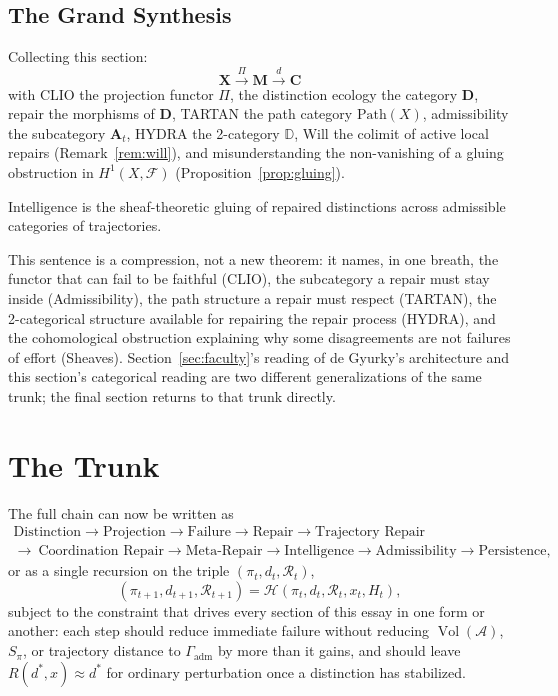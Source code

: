 \documentclass[11pt]{article}
\theoremstyle{plain}
\theoremstyle{definition}
\theoremstyle{remark}
\begin{document}
\subsection{The Grand Synthesis}

Collecting this section:
\[
\mathbf{X} \xrightarrow{\;\Pi\;} \mathbf{M} \xrightarrow{\;d\;} \mathbf{C}
\]
with CLIO the projection functor $\Pi$, the distinction ecology the category $\mathbf{D}$, repair the morphisms of $\mathbf{D}$, TARTAN the path category $\mathrm{Path}(X)$, admissibility the subcategory $\mathbf{A}_t$, HYDRA the 2-category $\mathbb{D}$, Will the colimit of active local repairs (Remark~\ref{rem:will}), and misunderstanding the non-vanishing of a gluing obstruction in $H^1(X,\mathscr{F})$ (Proposition~\ref{prop:gluing}).

\begin{tcolorbox}[title=Categorical Compression]
\centering
Intelligence is the sheaf-theoretic gluing of repaired distinctions across admissible categories of trajectories.
\end{tcolorbox}

This sentence is a compression, not a new theorem: it names, in one breath, the functor that can fail to be faithful (CLIO), the subcategory a repair must stay inside (Admissibility), the path structure a repair must respect (TARTAN), the 2-categorical structure available for repairing the repair process (HYDRA), and the cohomological obstruction explaining why some disagreements are not failures of effort (Sheaves). Section~\ref{sec:faculty}'s reading of de Gyurky's architecture and this section's categorical reading are two different generalizations of the same trunk; the final section returns to that trunk directly.

\section{The Trunk}

The full chain can now be written as
\[
\begin{gathered}
\text{Distinction} \to \text{Projection} \to \text{Failure} \to \text{Repair} \to \text{Trajectory Repair}\\[2pt]
\to\ \text{Coordination Repair} \to \text{Meta-Repair} \to \text{Intelligence} \to \text{Admissibility} \to \text{Persistence},
\end{gathered}
\]
or as a single recursion on the triple $(\pi_t,d_t,\mathcal{R}_t)$,
\[
(\pi_{t+1}, d_{t+1}, \mathcal{R}_{t+1}) = \mathcal{H}(\pi_t, d_t, \mathcal{R}_t, x_t, H_t),
\]
subject to the constraint that drives every section of this essay in one form or another: each step should reduce immediate failure without reducing $\operatorname{Vol}(\mathcal{A})$, $S_\pi$, or trajectory distance to $\Gamma_{\mathrm{adm}}$ by more than it gains, and should leave $R(d^\ast,x)\approx d^\ast$ for ordinary perturbation once a distinction has stabilized.
\end{document}
